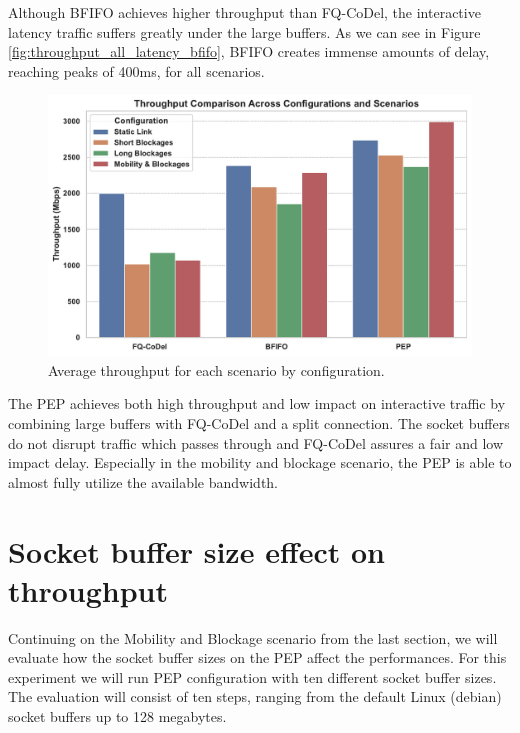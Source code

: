 \documentclass[a4paper,english, 11pt]{report}
\begin{document}
Although BFIFO achieves higher throughput than FQ-CoDel, the interactive latency traffic suffers greatly under the large buffers. As we can see in Figure \ref{fig:throughput_all_latency_bfifo}, BFIFO creates immense amounts of delay, reaching peaks of 400ms, for all scenarios.\\

\begin{figure}[!h!] %
	\centering
	\includegraphics[scale=0.55]{../diagrams/witestlab/throughput/all.pdf}
  	\caption{Average throughput for each scenario by configuration.}
  	\label{fig:throughput_all}
\end{figure}

The PEP achieves both high throughput and low impact on interactive traffic by combining large buffers with FQ-CoDel and a split connection. The socket buffers do not disrupt traffic which passes through and FQ-CoDel assures a fair and low impact delay. Especially in the mobility and blockage scenario, the PEP is able to almost fully utilize the available bandwidth.\\

\section{Socket buffer size effect on throughput}
Continuing on the Mobility and Blockage scenario from the last section, we will evaluate how the socket buffer sizes on the PEP affect the performances. For this experiment we will run PEP configuration with ten different socket buffer sizes. The evaluation will consist of ten steps, ranging from the default Linux (debian) socket buffers up to 128 megabytes.\\
\end{document}
